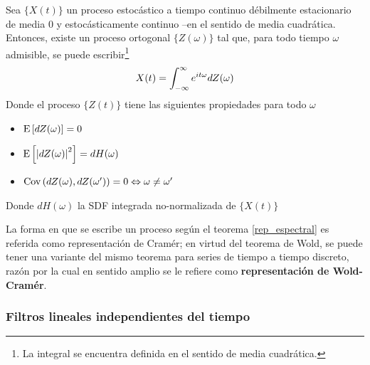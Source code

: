 \begin{thrm}
Sea $\{X(t)\}$ un proceso estoc\'astico a tiempo continuo d\'ebilmente estacionario
de media 0
y estoc\'asticamente continuo --en el 
sentido de media cuadr\'atica. Entonces, existe un proceso ortogonal $\{Z(\omega)\}$ tal que, para 
todo tiempo $\omega$ admisible, se puede escribir\footnote{La integral se encuentra definida en el
sentido de media cuadr\'atica.}
\begin{equation*}
X(t) = \int_{-\infty}^{\infty} e^{i t \omega} dZ(\omega)
\end{equation*}
Donde el proceso $\{Z(t)\}$ tiene las siguientes propiedades para todo $\omega$
\begin{itemize}
\item $\mathrm{E}\left[ dZ(\omega) \right] = 0$
\item $\mathrm{E}\left[ \left| dZ(\omega) \right|^{2} \right] = dH(\omega)$
\item $\mathrm{Cov}\left( dZ(\omega),dZ(\omega^{\prime}) \right) = 0 \Leftrightarrow \omega \neq \omega^{\prime}$
\end{itemize}
Donde $dH(\omega)$ la SDF integrada no-normalizada de $\{X(t)\}$
\label{rep_espectral}
\end{thrm}

La forma en que se escribe un proceso seg\'un el teorema \ref{rep_espectral} es referida como
{representaci\'on de Cram\'er}; en virtud del teorema de Wold, se puede tener una variante
del mismo teorema para series de tiempo a tiempo discreto, raz\'on por la cual
en sentido amplio se le refiere como \textbf{representaci\'on de Wold-Cram\'er}.

\subsubsection{Filtros lineales independientes del tiempo}

